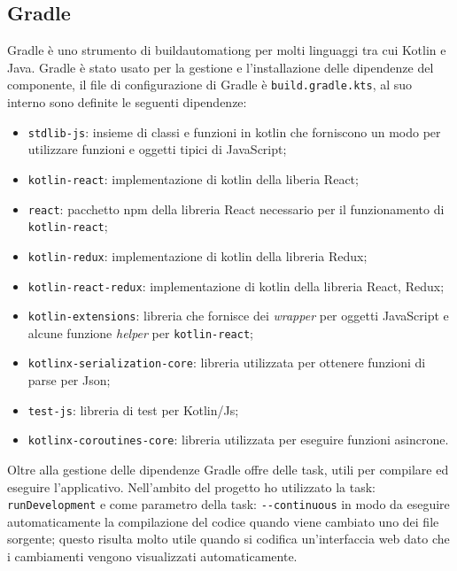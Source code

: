 \subsection{Gradle}
Gradle è uno strumento di \gls{buildautomationg} per molti linguaggi tra cui Kotlin e Java. Gradle è stato usato per la gestione e l'installazione delle dipendenze del componente, il file di configurazione di Gradle è \verb|build.gradle.kts|, al suo interno sono definite le seguenti dipendenze:
\begin{itemize}
	\item \verb|stdlib-js|: insieme di classi e funzioni in kotlin che forniscono un modo per utilizzare funzioni e oggetti tipici di JavaScript;
	
	\item \verb|kotlin-react|: implementazione di kotlin della liberia React;
	
	\item \verb|react|: pacchetto npm della libreria React necessario per il funzionamento di \verb|kotlin-react|;
	
	\item \verb|kotlin-redux|: implementazione di kotlin della libreria Redux;
	
	\item \verb|kotlin-react-redux|: implementazione di kotlin della libreria React, Redux;
	
	\item \verb|kotlin-extensions|: libreria che fornisce dei \emph{wrapper} per oggetti JavaScript e alcune funzione \emph{helper} per \verb|kotlin-react|;
	
	\item \verb|kotlinx-serialization-core|: libreria utilizzata per ottenere funzioni di parse per Json;
	
	\item \verb|test-js|: libreria di test per Kotlin/Js;
	
	\item \verb|kotlinx-coroutines-core|: libreria utilizzata per eseguire funzioni asincrone.
\end{itemize}
\noindent
Oltre alla gestione delle dipendenze Gradle offre delle task, utili per compilare ed eseguire l'applicativo. Nell'ambito del progetto ho utilizzato la task: \verb|runDevelopment| e come parametro della task: \verb|--continuous| in modo da eseguire automaticamente la compilazione del codice quando viene cambiato uno dei file sorgente; questo risulta molto utile quando si codifica un'interfaccia web dato che i cambiamenti vengono visualizzati automaticamente.

